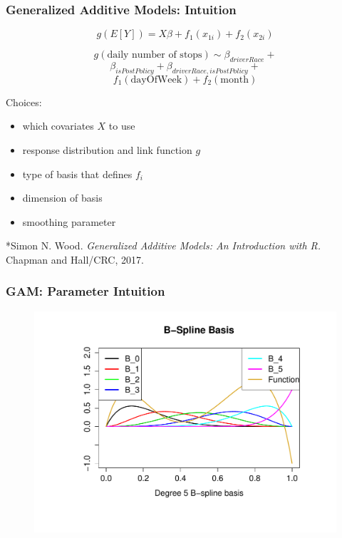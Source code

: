 \documentclass{beamer}
\begin{document}
\begin{frame}


\frametitle{Generalized Additive Models: Intuition}

$$ g(E[Y]) = X\beta + f_1(x_{1i})+f_2(x_{2i})$$

$$g(\text{daily number of stops}) \sim \beta_{driverRace} + $$
$$\beta_{isPostPolicy}+ \beta_{driverRace, isPostPolicy}+$$
$$ f_1(\text{dayOfWeek}) + f_2(\text{month}) $$


Choices: 
\begin{itemize}
\item which covariates $X$ to use
\item response distribution and link function $g$
\item type of basis that defines $f_i$
\item dimension of basis
\item smoothing parameter
\end{itemize}

\footnotesize{*Simon N. Wood. \textit{Generalized Additive Models: An Introduction with R.} Chapman and Hall/CRC, 2017.}
\end{frame}

\begin{frame}
\frametitle{GAM: Parameter Intuition}
\begin{figure}
\includegraphics[scale=.4]{figures/bSplineBasis}
\end{figure}

\end{frame}
\end{document}
